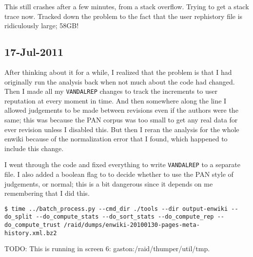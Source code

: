 This still crashes after a few minutes, from a stack overflow.
Trying to get a stack trace now.
Tracked down the problem to the fact that the user rephistory file
is ridiculously large; 58GB!

\subsection{17-Jul-2011}

After thinking about it for a while, I realized that the problem
is that I had originally run the analysis back when not much about
the code had changed.
Then I made all my \texttt{VANDALREP} changes to track the increments
to user reputation at every moment in time.
And then somewhere along the line I allowed judgements to be made between
revisions even if the authors were the same; this was because
the PAN corpus was too small to get any real data for ever revision
unless I disabled this.
But then I reran the analysis for the whole enwiki because of
the normalization error that I found, which happened to include this
change.

I went through the code and fixed everything to write
\texttt{VANDALREP} to a separate file.
I also added a boolean flag to 
to decide whether to use the PAN style of judgements, or normal;
this is a bit dangerous since it depends on me remembering that
I did this.

\begin{verbatim}
$ time ../batch_process.py --cmd_dir ./tools --dir output-enwiki --do_split --do_compute_stats --do_sort_stats --do_compute_rep --do_compute_trust /raid/dumps/enwiki-20100130-pages-meta-history.xml.bz2
\end{verbatim}

TODO: This is running in screen 6: gaston:/raid/thumper/util/tmp.

